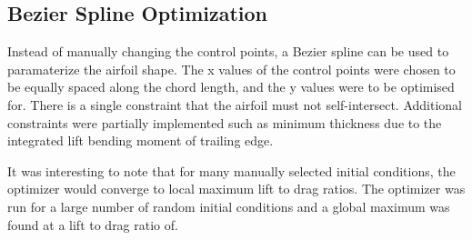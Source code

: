 \documentclass{article}
\begin{document}
\subsection{Bezier Spline Optimization}

Instead of manually changing the control points, a Bezier spline can be used to paramaterize the airfoil shape.
The x values of the control points were chosen to be equally spaced along the chord length, and the y values were to be optimised for.
There is a single constraint that the airfoil must not self-intersect.
Additional constraints were partially implemented such as minimum thickness due to the integrated lift bending moment of trailing edge.

It was interesting to note that for many manually selected initial conditions, the optimizer would converge to local maximum lift to drag ratios.
The optimizer was run for a large number of random initial conditions and a global maximum was found at a lift to drag ratio of.
\end{document}

